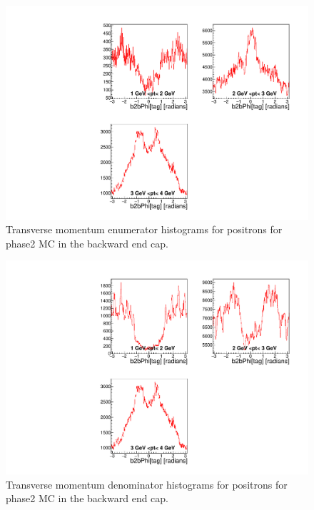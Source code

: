 \documentclass[a4paper,11pt,twosided,final,german,openbib,pdftex,listof=totoc,bibliography=totoc]{scrbook}
\begin{document}
\begin{appendix}
\begin{figure}[!htbp]
	\centering
	\includegraphics[width=\textwidth]{Plots/master/xPtMPhiepECE_MC}
	\caption[Transverse Momentum $\phi$ Positron Backward End Cap Enumerator Histogram Phase2 MC]{Transverse momentum enumerator histograms for positrons for phase2 MC in the backward end cap.}
	\label{plt:PtMPhiepECE_MC}
\end{figure}

\begin{figure}[!htbp]
	\centering
	\includegraphics[width=\textwidth]{Plots/master/xPtMPhiepECD_MC}
	\caption[Transverse Momentum $\phi$ Positron Backward End Cap Denominator Histogram Phase2 MC]{Transverse momentum denominator histograms for positrons for phase2 MC in the backward end cap.}
	\label{plt:PtMPhiepECD_MC}
\end{figure}



\end{appendix}
\end{document}
